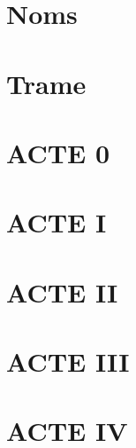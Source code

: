 



\parskip=1mm\tableofcontents
\clearpage

\section{Noms}


\clearpage

\section{Trame}
\vspace{3cm}


\clearpage
\begin{spacing}{1.3}
\section{ACTE 0}

\clearpage
\section{ACTE I}


\clearpage
\section{ACTE II}


\clearpage
\section{ACTE III}


\clearpage
\section{ACTE IV}

\end{spacing}

